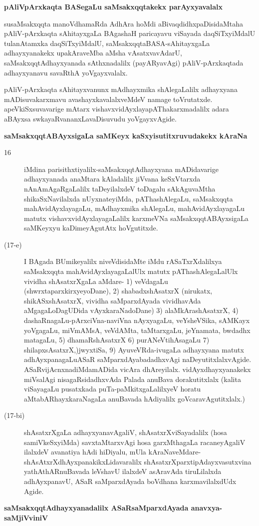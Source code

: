 \eject

{\medskip
\noindent
{\large\bf pAliVpArxkaqta BASegaLu saMsakxqqtakekx parAyxyavalalx}}\label{page44b}
\medskip

\noindent
susaMsakxqqta manoVdhamaRda AdhAra hoMdi aBivaqdidhxpaDisidaMtaha pAliV-pArxkaqta sAhitayxgaLa BAga\-shaH paricayavu viSayada daqSiTx\-yiMdalU tulanAtamxka daqSiTx\break\-yiMdalU, saMsakxqqtaBASA-sAhitayxgaLa adhayx\-yanakekx upakAraveMba aMsha vAsatxva\-vAdarU, saMsakxqqtAdhayxyanada sAthxnadalilx (payARyavAgi) pAliV-\-pArxkaqtada adhayx\-yanavu savaRthA yoVgayxvalalx.


pAliV-pArxkaqta sAhitayxvanunx mAdhayxmika shAlegaLalilx adhayxyana mADisuva\break \hbox{karxmavu} avashayxka\-valalx\-veMdeV namage toVrutatxde. apeVkiSxsuvavarige mAtarx vishavx\-vidAyx\-layapAThakarxmadalilx adara aBAyxsa swkayaRvananxLa\-vaDisu\-vudu yoVgayxvAgide.

{\bigskip
\noindent
{\large\bf saMsakxqqtABAyxsigaLa saMKeyx kaSxyisutitxruvudakekx kAraNa}}\label{page45}

\begin{description}
\item[16] iMdina parisithxtiyalilx-saMsakxqqtAdhayxyana mADidavarige adhayxyanada anaM\-tara kAladalilx jiVvana keSxVtarxda nAnAmAgaRgaLalilx taDeyilalxdeV toDagalu sAkA\-guvaMtha shikaSxNavilalxda nUyxnateyiMda, pAThashAlegaLu, saMsakxqqta mahA\-vidAyx\-layagaLu, mAdhayxmika shAlegaLu, mahAvidAyxlayagaLu matutx vishavxvidAyx\-layagaLalilx karxmeVNa saMsakxqqtABAyxsigaLa saMKeyxyu kaDimeyAgutAtx hoVgutitxde.

\item[(17-e)] I BAgada BUmikeyalilx niveVdisidaMte iMdu rASaTxrXdalilxya saMsakxqqta mahAvidAyxlayagaLalUlx matutx pAThashAlegaLalUlx vividha shAsatxrXgaLa \hbox{aMdare-}
1) veVdagaLu (shwrxtaparxkirxyeyoDane), 2) shabadxshAsatxrX (nirukatx, shikASxshAsatxrX, vividha saMparxdAyada vividhavAda aMgagaLoDagUDida vAyxkaraNa\-doDane) 3) alaMkArashAsatxrX, 4) dashaRnagaLu-pArxciVna-naviVna nAyxyagaLu, veYsheV\-Sika, sAMKayx yoVgagaLu, miVmAMsA, veVdAMta, taMtarxgaLu, jeYnamata, bwdadhx matagaLu, 
5) dhamaRshAsatxrX 6) purANeVtihAsagaLu 7) shilapxsAsatxrX,)jwyxtiSa, 9) AyuveVRda-ivugaLa adhayxyana matutx adhAyxpanagaLu\break ASaR saMparxdAyabadadhxvAgi naDeyutitxlalxvAgide. ASaR\-vijAcnxnadiMda\break \hbox{mADida} vicAra dhAreyilalx. vidAyxdhayxyanakekx miVsalAgi nisagaRsidadhx\-vAda Palada anuBava doraku\-titxlalx (kalita viSayagaLu pusatxkada puTa-paMkitxgaLalilxyeV horatu aMtabARhayxkaraNagaLa anuBavada hAdi\-yalilx goVcaravAgutitxlalx.)

\item[(17-bi)] shAsatxrXgaLa adhayxyanavAgaliV, shAsatxrXviSayadalilx (hosa samiVkeSxyiMda) savxtaMtarxvAgi hosa garxMthagaLa racaneyAgaliV ilalxdeV avanatiya hAdi hiDiyalu, mUla kAraNaveMdare-\-shAsAtxrXdhAyxpanakikxLidavaralilx shAsatxrXparxti\-pAdayx\-vasutxvina yathAthARnuBavada leVshavU ilalxdeV asAra\-vAda tiruLilalxda adhAyxpanavU, ASaR saMparxdAyada boVdhana karxmavilalxdUdx Agide.
\end{description}
{\medskip
\noindent
{\large\bf saMsakxqqtAdhayxyanadalilx ASaRsaMparxdAyada anavxya-saMjiVviniV}}\label{page45a}

